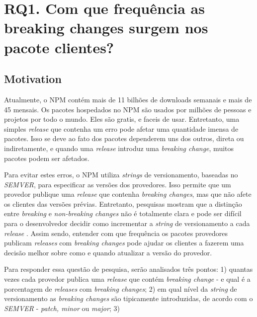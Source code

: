 \section{RQ1. Com que frequência as breaking changes surgem nos pacote clientes?}
\label{sec:rq1}

\subsection{Motivation}
\label{mot:rq1}

Atualmente, o NPM contém mais de 11 bilhões de downloads semanais e mais de 45 mensais. Os pacotes hospedados no NPM são usados por milhões de pessoas e projetos por todo o mundo. Eles são gratis, e faceis de usar. Entretanto, uma simples \textit{release} que contenha um erro pode afetar uma quantidade imensa de pacotes. Isso se deve ao fato dos pacotes dependerem uns dos outros, direta ou indiretamente, e quando uma \textit{release} introduz uma \textit{breaking change}, muitos pacotes podem ser afetados.

Para evitar estes erros, o NPM utiliza \textit{strings} de versionamento, baseadas no \textit{SEMVER}, para especificar as versões dos provedores. Isso permite que um provedor publique uma \textit{release} que contenha \textit{breaking changes}, mas que não afete os clientes das versões prévias. Entretanto, pesquisas mostram que a distinção entre \textit{breaking} e \textit{non-breaking changes} não é totalmente clara e pode ser difícil para o desenvolvedor decidir como incrementar a \textit{string} de versionamento a cada \textit{release} \cite{noregrets2018}. Assim sendo, entender com que frequência os pacotes provedores publicam \textit{releases} com \textit{breaking changes} pode ajudar os clientes a fazerem uma decisão melhor sobre como e quando atualizar a versão do provedor.

Para responder essa questão de pesquisa, serão analisados três pontos: 1) quantas vezes cada provedor publica uma \textit{release} que contém \textit{breaking change} - e qual é a porcentagem de \textit{releases} com \textit{breaking changes}; 2) em qual nível da \textit{string} de versionamento as \textit{breaking changes} são tipicamente introduzidas, de acordo com o \textit{SEMVER} - \textit{patch, minor} ou \textit{major}; 3)

